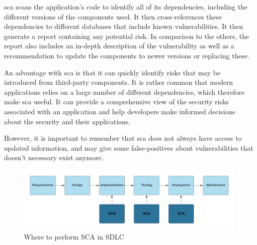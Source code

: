  \acrshort{sca} scans the application's code to identify all of its dependencies, including the different versions of the components used. It then cross-references these dependencies to different databases that include known vulnerabilities. It then generate a report containing any potential risk. In comparison to the others, the report also includes an in-depth description of the vulnerability as well as a recommendation to update the components to newer versions or replacing these. 

An advantage with \acrshort{sca} is that it can quickly identify risks that may be introduced from third-party components. It is rather common that modern applications relies on a large number of  different dependencies, which therefore make \acrshort{sca} useful. It can provide a comprehensive view of the security risks associated with an application and help developers make informed decisions about the security and their applications. 

However, it is important to remember that \acrshort{sca} does not always have access to updated information, and may give some false-positives about vulnerabilities that doesn't necessary exist anymore. 


\begin{figure}[htp]
    \centering
    \includegraphics[width=1\columnwidth]{Images/SCA.png}
    \caption{Where to perform SCA in SDLC} 
    \label{fig:my_label}
\end{figure}

\newpage
